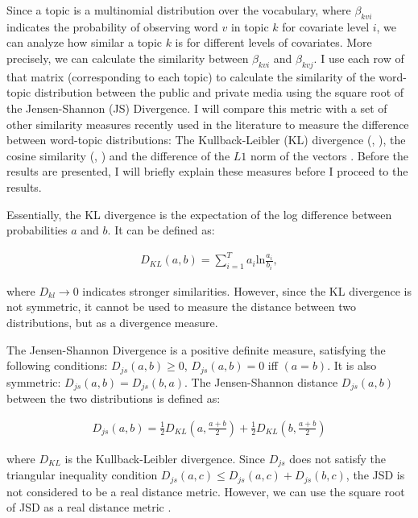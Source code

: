 \documentclass[12pt,a4paper,notitlepage]{article}
\begin{document}
{Since a topic is a multinomial distribution over the vocabulary, where $\beta_{kvi}$ indicates the probability of observing word $v$ in topic $k$ for covariate level $i$, we can analyze how similar a topic $k$ is for different levels of covariates. More precisely, we can calculate the similarity between $\beta_{kvi}$ and $\beta_{kvj}$. I use each row of that matrix (corresponding to each topic) to calculate the similarity of the word-topic distribution between the public and private media using the square root of the Jensen-Shannon (JS) Divergence. I will compare this metric with a set of other similarity measures recently used in the literature to measure the difference between word-topic distributions: The Kullback-Leibler (KL) divergence (\citet{newman_distributed_2009}, \citet{wang_mining_2009}), the cosine similarity (\citet{he_detecting_2009}, \citet{ramage_labeled_2009}) and the difference of the $L1$ norm of the vectors \citep{roberts_navigating_2016}. Before the results are presented, I will briefly explain these measures before I proceed to the results.

Essentially, the KL divergence is the expectation of the log difference between probabilities $a$ and $b$. It can be defined as:

\begin{align*}
	D_{KL}(a,b)=\sum_{i=1}^T a_i \text{ln} \frac{a_i}{b_i},
\end{align*}

where $D_{kl} \to 0$ indicates stronger similarities. However, since the KL divergence is not symmetric, it cannot be used to measure the distance between two distributions, but as a divergence measure.

The Jensen-Shannon Divergence is a positive definite measure, satisfying the following conditions: $D_{js}(a,b) \geq 0$, $D_{js}(a,b)=0$ iff $(a=b)$. It is also symmetric: $D_{js}(a,b)=D_{js}(b,a)$. The Jensen-Shannon distance $D_{js}(a,b)$ between the two distributions is defined as:

\begin{align*}
	D_{js}(a,b)=\frac{1}{2}D_{KL}(a,\frac{a+b}{2})+\frac{1}{2}D_{KL}(b,\frac{a+b}{2})
\end{align*}

where $D_{KL}$ is the Kullback-Leibler divergence. Since $D_{js}$ does not satisfy the triangular inequality condition $D_{js}(a,c)\leq D_{js}(a,c)+D_{js}(b,c)$, the JSD is not considered to be a real distance metric. However, we can use the square root of JSD as a real distance metric \citep{endres_new_2003}.

}
\end{document}
